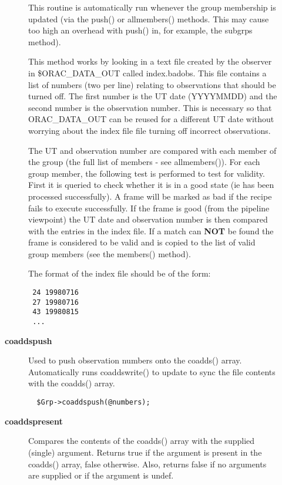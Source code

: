 \begin{description}
\begin{description}
This routine is automatically run whenever the group membership
is updated (via the push() or  allmembers() methods. This may
cause too high an overhead with push() in, for example, the
subgrps method).



This method works by looking in a text file created by the
observer in \$ORAC\_DATA\_OUT called index.badobs. This file
contains a list of numbers (two per line) relating to observations
that should be turned off. The first number is the UT date
(YYYYMMDD) and the second number is the observation
number. This is necessary so that ORAC\_DATA\_OUT can be reused
for a different UT date without worrying about the index file
file turning off incorrect observations.



The UT and observation number are compared with each member of
the group (the full list of members - see allmembers()).
For each group member, the following test is performed to test
for validity. First it is queried to check whether it is in a
good state (ie has been processed successfully). 
A frame will be marked as bad if the recipe fails to execute
successfully. If the frame is good (from the pipeline viewpoint)
the UT date and observation number is then compared with the
entries in the index file. If a match can \textbf{NOT} be found the
frame is considered to be valid and is copied to the list of valid
group members (see the members() method).



The format of the index file should be of the form:

\begin{verbatim}
 24 19980716 
 27 19980716 
 43 19980815 
 ...
\end{verbatim}

\item[{\textbf{coaddspush}}] \mbox{}

Used to push observation numbers onto the coadds() array. Automatically
runs coaddswrite() to update to sync the file contents with the coadds()
array.

\begin{verbatim}
  $Grp->coaddspush(@numbers);
\end{verbatim}

\item[{\textbf{coaddspresent}}] \mbox{}

Compares the contents of the coadds() array with the supplied (single)
argument. Returns true if the argument is present in the coadds()
array, false otherwise. Also, returns false if no arguments are supplied
or if the argument is undef.


\end{description}
\end{description}
